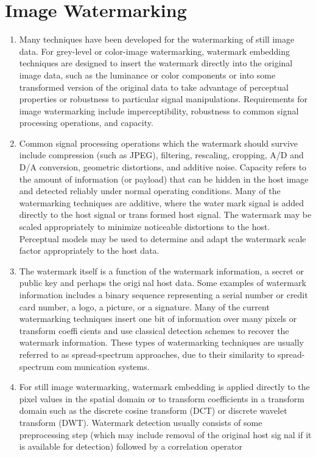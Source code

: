 \documentclass[12pt]{IEeetran}
\begin{document}
\section{Image Watermarking}
\begin{enumerate}
\item Many techniques have been developed for the
watermarking of still image data. For grey-level or
color-image watermarking, watermark embedding techniques are designed to insert the watermark directly into
the original image data, such as the luminance or color
components or into some transformed version of the
original data to take advantage of perceptual properties or
robustness to particular signal manipulations. Requirements for image watermarking include imperceptibility,
robustness to common signal processing operations, and
capacity.

\item Common signal processing operations which
the watermark should survive include compression (such
as JPEG), filtering, rescaling, cropping, A/D and D/A
conversion, geometric distortions, and additive noise.
Capacity refers to the amount of information (or payload) that can be hidden in the host image and detected
reliably under normal operating conditions. Many of the
watermarking techniques are additive, where the water￾mark signal is added directly to the host signal or trans￾formed host signal. The watermark may be scaled
appropriately to minimize noticeable distortions to the
host. Perceptual models may be used to determine and
adapt the watermark scale factor appropriately to the host
data.

\item The watermark itself is a function of the watermark
information, a secret or public key and perhaps the origi￾nal host data. Some examples of watermark information
includes a binary sequence representing a serial number
or credit card number, a logo, a picture, or a signature.
Many of the current watermarking techniques insert one
bit of information over many pixels or transform coeffi￾cients and use classical detection schemes to recover the
watermark information. These types of watermarking
techniques are usually referred to as spread-spectrum approaches, due to their similarity to spread-spectrum com￾munication systems.

\item For still image watermarking,
watermark embedding is applied directly to the pixel values in the spatial domain or to transform coefficients in a
transform domain such as the discrete cosine transform
(DCT) or discrete wavelet transform (DWT). Watermark detection usually consists of some preprocessing
step (which may include removal of the original host sig￾nal if it is available for detection) followed by a correlation
operator
\end{enumerate}
\end{document}
